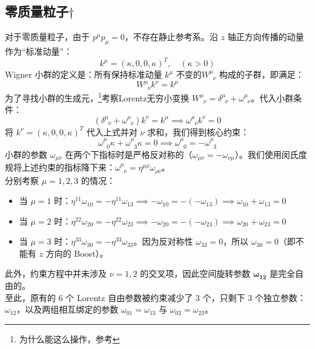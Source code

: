 \subsection{零质量粒子\(\dagger\)}\label{sec:massless-particle}
对于零质量粒子，由于 $p^\mu p_\mu = 0$，不存在静止参考系。沿 $z$ 轴正方向传播的动量作为“标准动量”：
\begin{equation}
    k^\mu = (\kappa, 0, 0, \kappa)^T, \quad (\kappa > 0)
\end{equation}
Wigner 小群的定义是：所有保持标准动量 $k^\mu$ 不变的$W^{\mu}_{\;\;\nu}$ 构成的子群，即满足：
\begin{equation}
    W^{\mu}_{\;\;\nu} k^\nu = k^\mu
\end{equation}
为了寻找小群的生成元，\footnote{为什么能这么操作，参考}考察Lorentz无穷小变换 $W^{\mu}_{\;\;\nu} = \delta^\mu_{\;\;\nu} + \omega^\mu_{\;\;\nu}$。代入小群条件：
\begin{equation}
    (\delta^\mu_{\;\;\nu} + \omega^\mu_{\;\;\nu}) k^\nu = k^\mu \implies \omega^\mu_{\;\;\nu} k^\nu = 0
\end{equation}
将 $k^\nu = (\kappa, 0, 0, \kappa)^T$ 代入上式并对 $\nu$ 求和，我们得到核心约束：
\begin{equation}
    \omega^\mu_{\;\;0} \kappa + \omega^\mu_{\;\;3} \kappa = 0 \implies \omega^\mu_{\;\;0} = -\omega^\mu_{\;\;3}
\end{equation}
小群的参数 $\omega_{\mu\nu}$ 在两个下指标时是严格反对称的（$\omega_{\mu\nu} = -\omega_{\nu\mu}$）。我们使用闵氏度规将上述约束的指标降下来：$\omega^\mu_{\;\;\nu} = \eta^{\mu\rho}\omega_{\rho\nu}$。
\vspace{2ex}
\\
分别考察 $\mu = 1, 2, 3$ 的情况：
\begin{itemize}
    \item 当 $\mu = 1$ 时：$\eta^{11}\omega_{10} = -\eta^{11}\omega_{13} \implies -\omega_{10} = -(-\omega_{13}) \implies \omega_{10} + \omega_{13} = 0$
    \item 当 $\mu = 2$ 时：$\eta^{22}\omega_{20} = -\eta^{22}\omega_{23} \implies -\omega_{20} = -(-\omega_{23}) \implies \omega_{20} + \omega_{23} = 0$
    \item 当 $\mu = 3$ 时：$\eta^{33}\omega_{30} = -\eta^{33}\omega_{33}$。因为反对称性 $\omega_{33}=0$，所以 $\omega_{30}=0$（即不能有 $z$ 方向的 Boost）。
\end{itemize}
\color{blue}此外，约束方程中并未涉及 $\nu = 1, 2$ 的交叉项，因此空间旋转参数 $\mathbf{\omega_{12}}$ 是完全自由的。\normalcolor
\vspace{2ex}
\\
至此，原有的 6 个 Lorentz 自由参数被约束减少了 3 个，只剩下 3 个独立参数：$\omega_{12}$，以及两组相互绑定的参数 $\omega_{01}=\omega_{13}$ 与 $\omega_{02}=\omega_{23}$。

